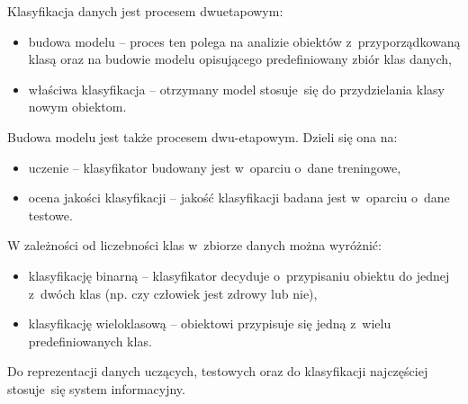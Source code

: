 Klasyfikacja danych jest procesem dwuetapowym:
\begin{itemize}
	\item budowa modelu – proces ten polega na analizie obiektów z przyporządkowaną klasą oraz na budowie modelu opisującego predefiniowany zbiór klas danych,
	\item właściwa klasyfikacja – otrzymany model stosuje się do przydzielania klasy nowym obiektom.
\end{itemize}
Budowa modelu jest także procesem dwu-etapowym. Dzieli się ona na:
\begin{itemize}
	\item uczenie – klasyfikator budowany jest w oparciu o dane treningowe,
	\item ocena jakości klasyfikacji – jakość klasyfikacji badana jest w oparciu o dane testowe.
\end{itemize}
W zależności od liczebności klas w~zbiorze danych można wyróżnić:
\begin{itemize}
	\item klasyfikację binarną – klasyfikator decyduje o przypisaniu obiektu do jednej z dwóch klas (np. czy człowiek jest zdrowy lub nie),
	\item klasyfikację wieloklasową – obiektowi przypisuje się jedną z~wielu predefiniowanych klas.
\end{itemize}
Do reprezentacji danych uczących, testowych oraz do klasyfikacji najczęściej stosuje się system informacyjny.
\begin{table}[H]
\begin{center}
	\caption[Przykła danych treningowych]{Przykład danych treningowych składających się z~5 atrybutów oraz klasy decyzyjnej. W ostatniej kolumnie znajduje się wynik klasyfikacji. W pięciu przypadkach, klasyfikator poprawnie wskazał klasę.}
	\label{system_informacyjny}
\end{center}
\end{table}


